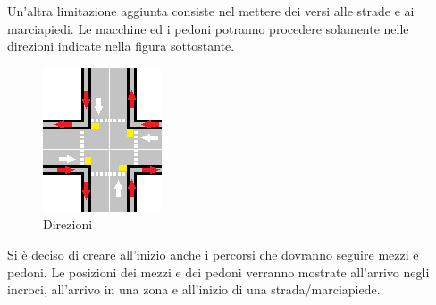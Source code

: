 \documentclass{article}
\begin{document}
Un\textquoteright{}altra limitazione aggiunta consiste nel mettere dei versi alle strade e ai marciapiedi. Le macchine ed i pedoni potranno procedere solamente nelle direzioni indicate nella figura sottostante.
\begin{figure}[H]
\begin{center}
\includegraphics{./img/Direzioni.png}
\caption{Direzioni}
\label{fig:Direzioni}
\end{center}
\end{figure}
Si \`{e} deciso di creare all\textquoteright{}inizio anche i percorsi che dovranno seguire mezzi e pedoni. Le posizioni dei mezzi e dei pedoni verranno mostrate all\textquoteright{}arrivo negli incroci, all\textquoteright{}arrivo in una zona e all\textquoteright{}inizio di una strada/marciapiede.
\end{document}
